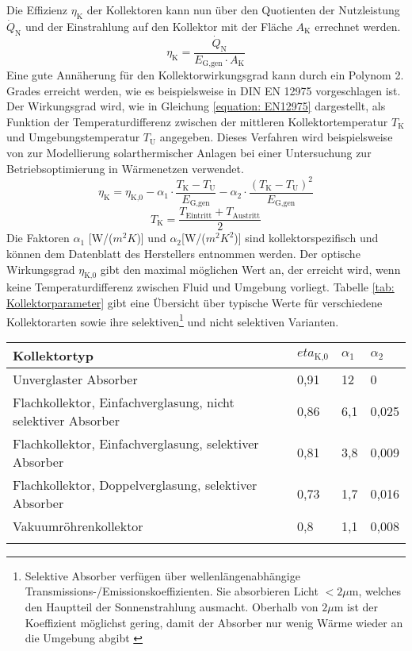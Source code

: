 Die Effizienz $\eta_\text{K}$ der Kollektoren kann nun über den Quotienten der Nutzleistung $\dot{Q}_\text{N}$ und der  Einstrahlung auf den Kollektor mit der Fläche $A_\text{K}$ errechnet werden.
\begin{equation}\label{equation: exakter Kollektorwirkungsgrad}
\eta_\text{K} = \dfrac{\dot{Q}_\text{N}}{E_\text{G,gen} \cdot A_\text{K}}
\end{equation}	
Eine gute Annäherung für den Kollektorwirkungsgrad kann durch ein Polynom 2. Grades erreicht werden, wie es beispielsweise in DIN EN 12975 \cite{EN12975} vorgeschlagen ist. Der Wirkungsgrad wird, wie in Gleichung \ref{equation: EN12975} dargestellt, als Funktion der Temperaturdifferenz zwischen der mittleren Kollektortemperatur $T_\text{K}$ und Umgebungstemperatur $T_\text{U}$ angegeben. Dieses Verfahren wird beispielsweise von \citet{YANG2017471} zur Modellierung solarthermischer Anlagen bei einer Untersuchung zur Betriebsoptimierung in Wärmenetzen verwendet.
\begin{equation}\label{equation: EN12975}
\eta_\text{K} = \eta_\text{K,0} - \alpha_1 \cdot \dfrac{T_\text{K} - T_\text{U}}{E_\text{G,gen}} - \alpha_2 \cdot \dfrac{(T_\text{K} - T_\text{U})^2}{E_\text{G,gen}}
\end{equation}
\begin{equation}
T_\text{K} = \dfrac{T_\text{Eintritt} + T_\text{Austritt}}{2}
\end{equation}
Die Faktoren $\alpha_1$ [W/($m^2 K$)] und $\alpha_2$[W/($m^2 K^2$)] sind kollektorspezifisch und können dem Datenblatt des Herstellers entnommen werden. Der optische Wirkungsgrad $\eta_\text{K,0}$ gibt den maximal möglichen Wert an, der erreicht wird, wenn keine Temperaturdifferenz zwischen Fluid und Umgebung vorliegt. Tabelle \ref{tab: Kollektorparameter} gibt eine Übersicht über typische Werte für verschiedene Kollektorarten sowie ihre selektiven\footnote{Selektive Absorber verfügen über wellenlängenabhängige Transmissions-/Emissionskoeffizienten. Sie absorbieren Licht $< 2 \mu$m, welches den Hauptteil der Sonnenstrahlung ausmacht. Oberhalb von $2 \mu$m ist der Koeffizient möglichst gering, damit der Absorber nur wenig Wärme wieder an die Umgebung abgibt \cite{Quaschning2015}} und nicht selektiven Varianten.
\begin{center}
	\begin{tabular}{llll}
		\hline 
		\rule{0pt}{12pt} Kollektortyp  & $eta_\text{K,0}$  & $\alpha_1$  & $\alpha_2$\tabularnewline
		\hline 
		
		Unverglaster Absorber  & 0,91  & 12  & 0  \tabularnewline
		Flachkollektor, Einfachverglasung, nicht selektiver Absorber & 0,86 & 6,1 & 0,025 \tabularnewline
		Flachkollektor, Einfachverglasung, selektiver Absorber  & 0,81 & 3,8 & 0,009 \tabularnewline
		Flachkollektor, Doppelverglasung, selektiver Absorber & 0,73 & 1,7 & 0,016 \tabularnewline
		Vakuumröhrenkollektor & 0,8 & 1,1 & 0,008 \tabularnewline
		\hline
		\label{tab: Kollektorparameter}  &  &  & 
	\end{tabular}
\end{center}

